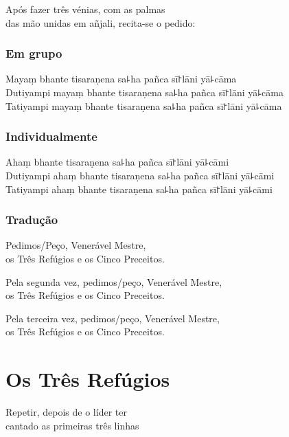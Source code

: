 \begin{instruction}
  Após fazer três vénias, com as palmas\\
  das mão unidas em añjali, recita-se o pedido:
\end{instruction}

\subsection{Em grupo}

Mayaṃ bhante tisaraṇena sa꜕ha pañca sī꜓lāni yā꜕cāma\\
Dutiyampi mayaṃ bhante tisaraṇena sa꜕ha pañca sī꜓lāni yā꜕cāma\\
Tatiyampi mayaṃ bhante tisaraṇena sa꜕ha pañca sī꜓lāni yā꜕cāma

\subsection{Individualmente}

Ahaṃ bhante tisaraṇena sa꜕ha pañca sī꜓lāni yā꜕cāmi\\
Dutiyampi ahaṃ bhante tisaraṇena sa꜕ha pañca sī꜓lāni yā꜕cāmi\\
Tatiyampi ahaṃ bhante tisaraṇena sa꜕ha pañca sī꜓lāni yā꜕cāmi

\subsection{Tradução}

\begin{english}
  Pedimos/Peço, Venerável Mestre,\\
  \vin os Três Refúgios e os Cinco Preceitos.

  Pela segunda vez, pedimos/peço, Venerável Mestre,\\
  \vin os Três Refúgios e os Cinco Preceitos.

  Pela terceira vez, pedimos/peço, Venerável Mestre,\\
  \vin os Três Refúgios e os Cinco Preceitos.
\end{english}

\clearpage
\chapter{Os Três Refúgios}

\begin{instruction}
  Repetir, depois de o líder ter\\
  cantado as primeiras três linhas
\end{instruction}

